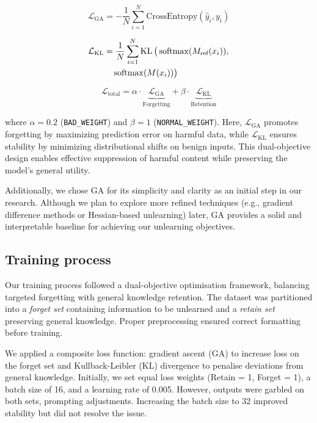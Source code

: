 \documentclass[11pt]{article}
\begin{document}
\begin{equation}
    \label{eq:ga}
    \mathcal{L}_{\text{GA}} = -\frac{1}{N} \sum_{i=1}^{N} \text{CrossEntropy}(\hat{y}_i, y_i)
\end{equation}

\begin{align}
    \label{eq:kl}
    \mathcal{L}_{\text{KL}} &= \frac{1}{N} \sum_{i=1}^{N} \operatorname{KL} \big( \operatorname{softmax}(M_{\text{ref}}(x_i)), \notag \\
    &\quad \operatorname{softmax}(M(x_i)) \big)
\end{align}

\begin{equation}
    \label{eq:loss}
    \mathcal{L}_{\text{total}} = \alpha \cdot \underbrace{\mathcal{L}_{\text{GA}}}_{\text{Forgetting}} + \beta \cdot \underbrace{\mathcal{L}_{\text{KL}}}_{\text{Retention}}
\end{equation}

where $\alpha = 0.2$ (\texttt{BAD\_WEIGHT}) and $\beta = 1$ (\texttt{NORMAL\_WEIGHT}). Here, $\mathcal{L}_{\text{GA}}$ promotes forgetting by maximizing prediction error on harmful data, while $\mathcal{L}_{\text{KL}}$ ensures stability by minimizing distributional shifts on benign inputs. This dual-objective design enables effective suppression of harmful content while preserving the model’s general utility.

Additionally, we chose GA for its simplicity and clarity as an initial step in our research. Although we plan to explore more refined techniques (e.g., gradient difference methods or Hessian-based unlearning) later, GA provides a solid and interpretable baseline for achieving our unlearning objectives.

\subsection*{Training process}

Our training process followed a dual-objective optimisation framework, balancing targeted forgetting with general knowledge retention. The dataset was partitioned into a \textit{forget set} containing information to be unlearned and a \textit{retain set} preserving general knowledge. Proper preprocessing ensured correct formatting before training.

We applied a composite loss function: gradient ascent (GA) to increase loss on the forget set and Kullback-Leibler (KL) divergence to penalise deviations from general knowledge. Initially, we set equal loss weights (Retain = 1, Forget = 1), a batch size of 16, and a learning rate of 0.005. However, outputs were garbled on both sets, prompting adjustments. Increasing the batch size to 32 improved stability but did not resolve the issue.
\end{document}
